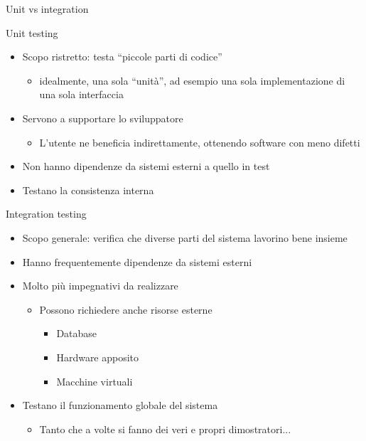 \documentclass[xcolor=dvipsnames,presentation]{beamer}
\begin{document}
\begin{frame}[allowframebreaks]{Unit vs integration}
	\begin{block}{Unit testing}
		\begin{itemize}
			\item Scopo ristretto: testa ``piccole parti di codice''
			\begin{itemize}
				\item idealmente, una sola ``unità'', ad esempio una sola implementazione di una sola interfaccia
			\end{itemize}
			\item Servono a supportare lo sviluppatore
			\begin{itemize}
				\item L'utente ne beneficia indirettamente, ottenendo software con meno difetti
			\end{itemize}
			\item Non hanno dipendenze da sistemi esterni a quello in test
			\item Testano la consistenza interna
		\end{itemize}
	\end{block}
	\begin{block}{Integration testing}
		\begin{itemize}
			\item Scopo generale: verifica che diverse parti del sistema lavorino bene insieme
			\item Hanno frequentemente dipendenze da sistemi esterni
			\item Molto più impegnativi da realizzare
			\begin{itemize}
				\item Possono richiedere anche risorse esterne
				\begin{itemize}
					\item Database
					\item Hardware apposito
					\item Macchine virtuali
				\end{itemize}
			\end{itemize}
			\item Testano il funzionamento globale del sistema
			\begin{itemize}
				\item Tanto che a volte si fanno dei veri e propri dimostratori...
			\end{itemize}
		\end{itemize}
	\end{block}
\end{frame}
\end{document}
